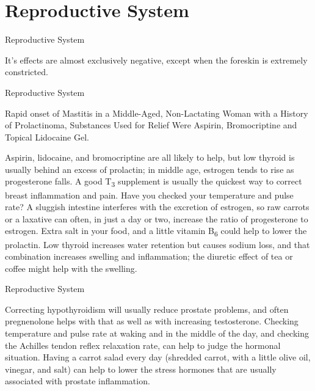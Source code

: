 \documentclass[11pt,oneside,openany,extrafontsizes]{memoir}
\begin{document}
\section{Reproductive System}

\begin{standalonequote}{Reproductive System}

    \begin{answer}
        It's effects are almost exclusively negative, except when the foreskin is extremely constricted.
    \end{answer}
\end{standalonequote}

\begin{standalonequote}{Reproductive System}
    \begin{note}
        Rapid onset of Mastitis in a Middle-Aged, Non-Lactating Woman with a History of Prolactinoma, Substances Used for Relief Were Aspirin, Bromocriptine and Topical Lidocaine Gel.
    \end{note}

    \begin{answer}
        Aspirin, lidocaine, and bromocriptine are all likely to help, but low thyroid is usually behind an excess of prolactin; in middle age, estrogen tends to rise as progesterone falls. A good T\textsubscript{3} supplement is usually the quickest way to correct breast inflammation and pain. Have you checked your temperature and pulse rate? A sluggish intestine interferes with the excretion of estrogen, so raw carrots or a laxative can often, in just a day or two, increase the ratio of progesterone to estrogen. Extra salt in your food, and a little vitamin B\textsubscript{6} could help to lower the prolactin. Low thyroid increases water retention but causes sodium loss, and that combination increases swelling and inflammation; the diuretic effect of tea or coffee might help with the swelling.
    \end{answer}
\end{standalonequote}

\begin{standalonequote}{Reproductive System}

    \begin{answer}
        Correcting hypothyroidism will usually reduce prostate problems, and often pregnenolone helps with that as well as with increasing testosterone. Checking temperature and pulse rate at waking and in the middle of the day, and checking the Achilles tendon reflex relaxation rate, can help to judge the hormonal situation. Having a carrot salad every day (shredded carrot, with a little olive oil, vinegar, and salt) can help to lower the stress hormones that are usually associated with prostate inflammation.
    \end{answer}
\end{standalonequote}
\end{document}

